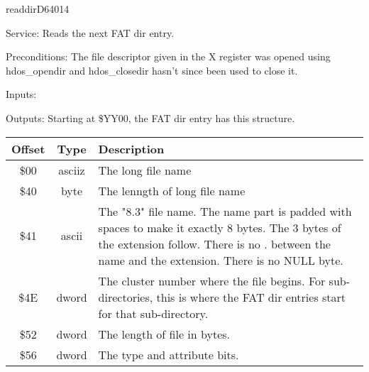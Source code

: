 \newpage
\begin{hyppotrap}{readdir}{D640}{14}
\item [Service:]
  Reads the next FAT dir entry.
\item [Preconditions:]
  The file descriptor given in the X register was opened using hdos\_opendir
  and hdos\_closedir hasn't since been used to close it.
\item [Inputs:]
\item [Outputs:]
  Starting at \$YY00, the FAT dir entry has this structure.
  {\setlength{\tabcolsep}{2mm}
  \begin{tabular}{|c|c|p{6.9cm}|}
  \hline
  \textbf{Offset} & \textbf{Type} & \textbf{Description}
  \\\hline
  \$00 & asciiz & The long file name
  \\
  \$40 & byte & The lenngth of long file name
  \\
  \$41 & ascii & The "8.3" file name. The name part is padded with spaces to make
               it exactly 8 bytes. The 3 bytes of the extension follow. There is
               no . between the name and the extension. There is no NULL byte.
  \\
  \$4E & dword & The cluster number where the file begins. For sub-directories,
               this is where the FAT dir entries start for that sub-directory.
  \\
  \$52 & dword & The length of file in bytes.
  \\
  \$56 & dword & The type and attribute bits.
  \\\hline
  \end{tabular}
  }


\end{hyppotrap}
